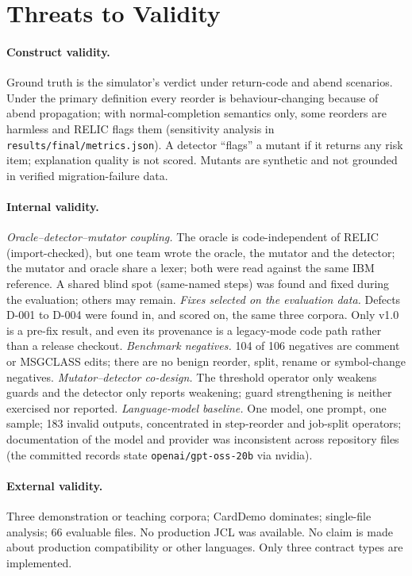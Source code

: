 \section{Threats to Validity}
\label{sec:threats}

\paragraph{Construct validity.}
Ground truth is the simulator's verdict under return-code and abend scenarios.
Under the primary definition every reorder is behaviour-changing because of
abend propagation; with normal-completion semantics only, some reorders are
harmless and RELIC flags them (sensitivity analysis in
\texttt{results/final/metrics.json}). A detector ``flags'' a mutant if it
returns any risk item; explanation quality is not scored. Mutants are
synthetic and not grounded in verified migration-failure data.

\paragraph{Internal validity.}
\emph{Oracle--detector--mutator coupling.} The oracle is code-independent of
RELIC (import-checked), but one team wrote the oracle, the mutator and the
detector; the mutator and oracle share a lexer; both were read against the same
IBM reference. A shared blind spot (same-named steps) was found and fixed during
the evaluation; others may remain.
\emph{Fixes selected on the evaluation data.} Defects D-001 to D-004 were found
in, and scored on, the same three corpora. Only v1.0 is a pre-fix result, and
even its provenance is a legacy-mode code path rather than a release checkout.
\emph{Benchmark negatives.} 104 of 106 negatives are comment or MSGCLASS edits;
there are no benign reorder, split, rename or symbol-change negatives.
\emph{Mutator--detector co-design.} The threshold operator only weakens guards and
the detector only reports weakening; guard strengthening is neither exercised nor
reported.
\emph{Language-model baseline.} One model, one prompt, one sample; 183 invalid
outputs, concentrated in step-reorder and job-split operators; documentation
of the model and provider was inconsistent across repository files (the committed
records state \texttt{openai/gpt-oss-20b} via nvidia).

\paragraph{External validity.}
Three demonstration or teaching corpora; CardDemo dominates; single-file
analysis; 66 evaluable files. No production JCL was available. No claim is made
about production compatibility or other languages. Only three contract types
are implemented.


